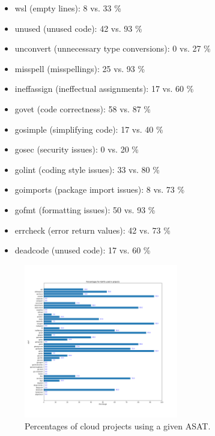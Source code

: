 \documentclass{seal_article}
\begin{document}
\begin{itemize}
    \item wsl (empty lines): 8 vs. 33 \%
    \item unused (unused code): 42 vs. 93 \%
    \item unconvert (unnecessary type conversions): 0 vs. 27 \%
    \item misspell (misspellings): 25 vs. 93 \%
    \item ineffassign (ineffectual assignments): 17 vs. 60 \%
    \item govet (code correctness): 58 vs. 87 \%
    \item gosimple (simplifying code): 17 vs. 40 \%
    \item gosec (security issues): 0 vs. 20 \%
    \item golint (coding style issues): 33 vs. 80 \%
    \item goimports (package import issues): 8 vs. 73 \%
    \item gofmt (formatting issues): 50 vs. 93 \%
    \item errcheck (error return values): 42 vs. 73 \%
    \item deadcode (unused code): 17 vs. 60 \%
\end{itemize}


\begin{figure}
\centering
    \includegraphics[width=0.6\textwidth]{img/cloud-projects.png}
    \caption{Percentages of cloud projects using a given ASAT.}
    \label{fig:perc-cloudapps}
\end{figure}
\end{document}
